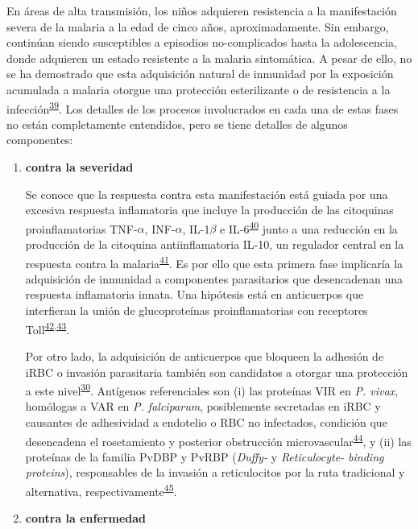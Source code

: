 \documentclass[]{article}
\begin{document}
\begin{enumerate}
\begin{enumerate}
    En áreas de alta transmisión, los niños adquieren resistencia a la
    manifestación severa de la malaria a la edad de cinco años,
    aproximadamente. Sin embargo, continúan siendo susceptibles a
    episodios no-complicados hasta la adolescencia, donde adquieren un
    estado resistente a la malaria sintomática. A pesar de ello, no se
    ha demostrado que esta adquisición natural de inmunidad por la
    exposición acumulada a malaria otorgue una protección esterilizante
    o de resistencia a la
    infección\textsuperscript{\protect\hyperlink{ref-crompton2014rev}{39}}.
    Los detalles de los procesos involucrados en cada una de estas fases
    no están completamente entendidos, pero se tiene detalles de algunos
    componentes:

    \begin{enumerate}
    \def\labelenumiii{\arabic{enumiii}.}
    \item
      \textbf{contra la severidad}

      Se conoce que la respuesta contra esta manifestación está guiada
      por una excesiva respuesta inflamatoria que incluye la producción
      de las citoquinas proinflamatorias TNF-\(\alpha\), INF-\(\alpha\),
      IL-1\(\beta\) e
      IL-6\textsuperscript{\protect\hyperlink{ref-baird2013}{40}} junto
      a una reducción en la producción de la citoquina antiinflamatoria
      IL-10, un regulador central en la respuesta contra la
      malaria\textsuperscript{\protect\hyperlink{ref-jagannathan2014}{41}}.
      Es por ello que esta primera fase implicaría la adquisición de
      inmunidad a componentes parasitarios que desencadenan una
      respuesta inflamatoria innata. Una hipótesis está en anticuerpos
      que interfieran la unión de glucoproteínas proinflamatorias con
      receptores
      Toll\textsuperscript{\protect\hyperlink{ref-schofield2006toll}{42},\protect\hyperlink{ref-coban2005toll}{43}}.

      Por otro lado, la adquisición de anticuerpos que bloqueen la
      adhesión de iRBC o invasión parasitaria también son candidatos a
      otorgar una protección a este
      nivel\textsuperscript{\protect\hyperlink{ref-wassmer2015}{30}}.
      Antígenos referenciales son (i) las proteínas VIR en \emph{P.
      vivax}, homólogas a VAR en \emph{P. falciparum}, posiblemente
      secretadas en iRBC y causantes de adhesividad a endotelio o RBC no
      infectados, condición que desencadena el rosetamiento y posterior
      obstrucción
      microvascular\textsuperscript{\protect\hyperlink{ref-portillo2001vir}{44}},
      y (ii) las proteínas de la familia PvDBP y PvRBP (\emph{Duffy-} y
      \emph{Reticulocyte- binding proteins}), responsables de la
      invasión a reticulocitos por la ruta tradicional y alternativa,
      respectivamente\textsuperscript{\protect\hyperlink{ref-galinski1992rbp}{45}}.
      \newpage
    \item
      \textbf{contra la enfermedad}


\end{enumerate}
\end{enumerate}
\end{enumerate}
\end{document}
